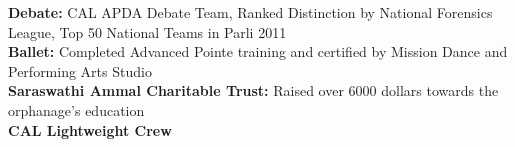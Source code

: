 \documentclass[9pt]{extarticle}
\newenvironment{changemargin}[2]{%
  \begin{list}{}{%
    \setlength{\topsep}{0pt}%
    \setlength{\leftmargin}{#1}%
    \setlength{\rightmargin}{#2}%
    \setlength{\listparindent}{\parindent}%
    \setlength{\itemindent}{\parindent}%
    \setlength{\parsep}{\parskip}%
  }%
  \item[]}{\end{list}
}
\newenvironment{body} {
	\vspace*{-9pt}
	\begin{changemargin}{-0.5in}{-0.5in}
  }	
	{\end{changemargin}
}
\begin{document}
\begin{body}
	\vspace{-1pt}
	
	\textbf{Debate: }{ CAL APDA Debate Team, Ranked Distinction by National Forensics League, Top 50 National Teams in Parli 2011}\\
	\textbf{Ballet: }{ Completed Advanced Pointe training and certified by Mission Dance and Performing Arts Studio}\\
	\textbf{Saraswathi Ammal Charitable Trust: }{ Raised over 6000 dollars towards the orphanage's education}\\
	\textbf{CAL Lightweight Crew}\\

%
	
%            
	\end{body}
\end{document}

